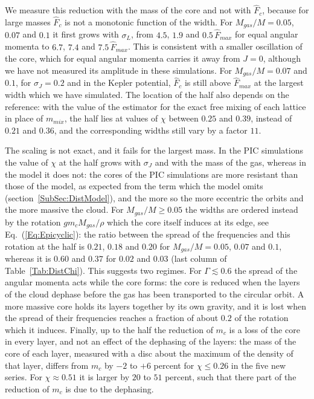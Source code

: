 We measure this reduction with the mass of the core and not with $\hat{F}_c$, because for large masses $\hat{F}_c$ is not a monotonic function of the width. For $M_{gas}/M = 0.05$, $0.07$ and $0.1$ it first grows with $\sigma_L$, from $4.5$, $1.9$ and $0.5\,\hat{F}_{max}$ for equal angular momenta to $6.7$, $7.4$ and $7.5\,\hat{F}_{max}$. This is consistent with a smaller oscillation of the core, which for equal angular momenta carries it away from $J = 0$, although we have not measured its amplitude in these simulations. For $M_{gas}/M = 0.07$ and $0.1$, for $\sigma_J = 0.2$ and in the Kepler potential, $\hat{F}_c$ is still above $\hat{F}_{max}$ at the largest width which we have simulated. The location of the half also depends on the reference: with the value of the estimator for the exact free mixing of each lattice in place of $m_{mix}$, the half lies at values of $\chi$ between $0.25$ and $0.39$, instead of $0.21$ and $0.36$, and the corresponding widths still vary by a factor $11$.

The scaling is not exact, and it fails for the largest mass. In the PIC simulations the value of $\chi$ at the half grows with $\sigma_J$ and with the mass of the gas, whereas in the model it does not: the cores of the PIC simulations are more resistant than those of the model, as expected from the term which the model omits (section~\ref{SubSec:DistModel}), and the more so the more eccentric the orbits and the more massive the cloud. For $M_{gas}/M\geq 0.05$ the widths are ordered instead by the rotation $g m_c M_{gas}/\rho$ which the core itself induces at its edge, see Eq.~(\ref{Eq:Epicyclic}): the ratio between the spread of the frequencies and this rotation at the half is $0.21$, $0.18$ and $0.20$ for $M_{gas}/M = 0.05$, $0.07$ and $0.1$, whereas it is $0.60$ and $0.37$ for $0.02$ and $0.03$ (last column of Table~\ref{Tab:DistChi}). This suggests two regimes. For $\Gamma\lesssim 0.6$ the spread of the angular momenta acts while the core forms: the core is reduced when the layers of the cloud dephase before the gas has been transported to the circular orbit. A more massive core holds its layers together by its own gravity, and it is lost when the spread of their frequencies reaches a fraction of about $0.2$ of the rotation which it induces. Finally, up to the half the reduction of $m_c$ is a loss of the core in every layer, and not an effect of the dephasing of the layers: the mass of the core of each layer, measured with a disc about the maximum of the density of that layer, differs from $m_c$ by $-2$ to $+6$ percent for $\chi\leq 0.26$ in the five new series. For $\chi\approx 0.51$ it is larger by $20$ to $51$ percent, such that there part of the reduction of $m_c$ is due to the dephasing.

